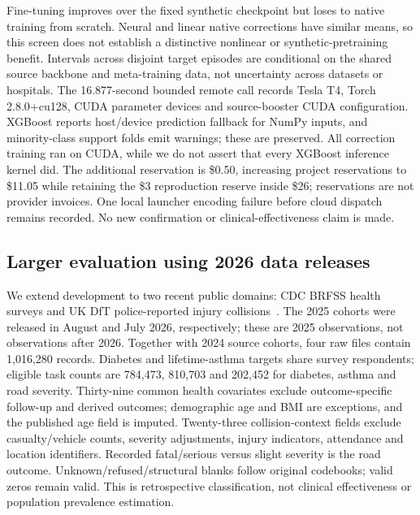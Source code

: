 \documentclass[10pt]{article}
\begin{document}
Fine-tuning improves over the fixed synthetic checkpoint but loses to native training from scratch. Neural and linear native corrections have similar means, so this screen does not establish a distinctive nonlinear or synthetic-pretraining benefit. Intervals across disjoint target episodes are conditional on the shared source backbone and meta-training data, not uncertainty across datasets or hospitals. The 16.877-second bounded remote call records Tesla T4, Torch 2.8.0+cu128, CUDA parameter devices and source-booster CUDA configuration. XGBoost reports host/device prediction fallback for NumPy inputs, and minority-class support folds emit warnings; these are preserved. All correction training ran on CUDA, while we do not assert that every XGBoost inference kernel did. The additional reservation is \$0.50, increasing project reservations to \$11.05 while retaining the \$3 reproduction reserve inside \$26; reservations are not provider invoices. One local launcher encoding failure before cloud dispatch remains recorded. No new confirmation or clinical-effectiveness claim is made.

\subsection{Larger evaluation using 2026 data releases}
We extend development to two recent public domains: CDC BRFSS health surveys and UK DfT police-reported injury collisions~\cite{brfss2025,road2025}. The 2025 cohorts were released in August and July 2026, respectively; these are 2025 observations, not observations after 2026. Together with 2024 source cohorts, four raw files contain 1,016,280 records. Diabetes and lifetime-asthma targets share survey respondents; eligible task counts are 784,473, 810,703 and 202,452 for diabetes, asthma and road severity. Thirty-nine common health covariates exclude outcome-specific follow-up and derived outcomes; demographic age and BMI are exceptions, and the published age field is imputed. Twenty-three collision-context fields exclude casualty/vehicle counts, severity adjustments, injury indicators, attendance and location identifiers. Recorded fatal/serious versus slight severity is the road outcome. Unknown/refused/structural blanks follow original codebooks; valid zeros remain valid. This is retrospective classification, not clinical effectiveness or population prevalence estimation.
\end{document}
